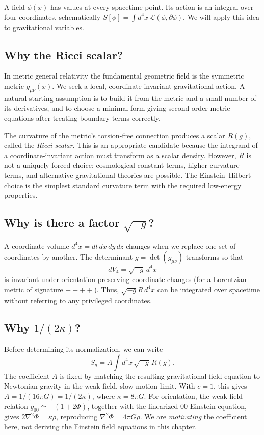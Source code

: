 \documentclass[11pt,a4paper]{article}
\begin{document}
A field $\phi(x)$ has values at every spacetime point. Its action is an integral over four coordinates, schematically $S[\phi]=\int d^4x\,\mathcal L(\phi,\partial\phi)$. We will apply this idea to gravitational variables.

\subsection{Why the Ricci scalar?}
In metric general relativity the fundamental geometric field is the symmetric metric $g_{\mu\nu}(x)$. We seek a local, coordinate-invariant gravitational action. A natural starting assumption is to build it from the metric and a small number of its derivatives, and to choose a minimal form giving second-order metric equations after treating boundary terms correctly.

The curvature of the metric's torsion-free connection produces a scalar $R(g)$, called the \emph{Ricci scalar}. This is an appropriate candidate because the integrand of a coordinate-invariant action must transform as a scalar density. However, $R$ is not a uniquely forced choice: cosmological-constant terms, higher-curvature terms, and alternative gravitational theories are possible. The Einstein--Hilbert choice is the simplest standard curvature term with the required low-energy properties.

\subsection{Why is there a factor $\sqrt{-g}$?}
A coordinate volume $d^4x=dt\,dx\,dy\,dz$ changes when we replace one set of coordinates by another. The determinant $g=\det(g_{\mu\nu})$ transforms so that
\begin{equation}\label{eq:volume}
dV_4=\sqrt{-g}\,d^4x
\end{equation}
is invariant under orientation-preserving coordinate changes (for a Lorentzian metric of signature $-+++$). Thus, $\sqrt{-g}R\,d^4x$ can be integrated over spacetime without referring to any privileged coordinates.

\subsection{Why $1/(2\kappa)$?}
Before determining its normalization, we can write
\begin{equation}
S_g=A\int d^4x\,\sqrt{-g}\,R(g).
\end{equation}
The coefficient $A$ is fixed by matching the resulting gravitational field equation to Newtonian gravity in the weak-field, slow-motion limit. With $c=1$, this gives $A=1/(16\pi G)=1/(2\kappa)$, where $\kappa=8\pi G$. For orientation, the weak-field relation $g_{00}\simeq-(1+2\Phi)$, together with the linearized $00$ Einstein equation, gives $2\nabla^2\Phi=\kappa\rho$, reproducing $\nabla^2\Phi=4\pi G\rho$. We are \emph{motivating} the coefficient here, not deriving the Einstein field equations in this chapter.
\end{document}
